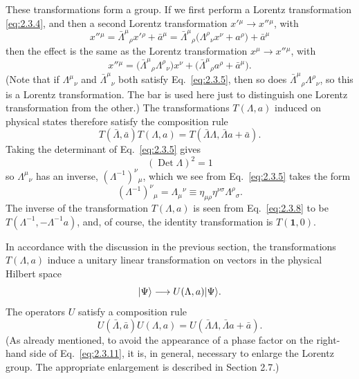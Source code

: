 These transformations form a group. If we first perform a Lorentz
transformation \eqref{eq:2.3.4}, and then a second Lorentz transformation
$x'{}^\mu\to x''{}^\mu$, with
\begin{equation*}
  x''{}^\mu=\bar\Lambda^\mu{}_{\rho}x'{}^\rho+\bar a^\mu
  =\bar\Lambda^\mu{}_{\rho}
    \bigl(\Lambda^\rho{}_{\nu}x^\nu+a^\rho\bigr)+\bar a^\mu
\end{equation*}
then the effect is the same as the Lorentz transformation
$x^\mu\to x''{}^\mu$, with
\begin{equation}
  x''{}^\mu
    =\bigl(\bar\Lambda^\mu{}_{\rho}\Lambda^\rho{}_{\nu}\bigr)x^\nu
      +\bigl(\bar\Lambda^\mu{}_{\rho}a^\rho+\bar a^\mu\bigr).
  \tag{2.3.7}\label{eq:2.3.7}
\end{equation}
(Note that if $\Lambda^\mu{}_{\nu}$ and $\bar\Lambda^\mu{}_{\nu}$ both
satisfy Eq.~\eqref{eq:2.3.5}, then so does
$\bar\Lambda^\mu{}_{\rho}\Lambda^\rho{}_{\nu}$, so this is a Lorentz
transformation. The bar is used here just to distinguish one Lorentz
transformation from the other.) The transformations $T(\Lambda,a)$
induced on physical states therefore satisfy the composition rule
\begin{equation}
  T(\bar\Lambda,\bar a)T(\Lambda,a)
    =T(\bar\Lambda\Lambda,\bar\Lambda a+\bar a).
  \tag{2.3.8}\label{eq:2.3.8}
\end{equation}
Taking the determinant of Eq.~\eqref{eq:2.3.5} gives
\begin{equation}
  (\operatorname{Det}\Lambda)^2=1
  \tag{2.3.9}\label{eq:2.3.9}
\end{equation}
so $\Lambda^\mu{}_{\nu}$ has an inverse,
$(\Lambda^{-1})^\nu{}_{\mu}$, which we see from Eq.~\eqref{eq:2.3.5} takes the form
\begin{equation}
  (\Lambda^{-1})^\nu{}_{\mu}
    =\Lambda_{\mu}{}^\nu
    \equiv\eta_{\mu\rho}\eta^{\nu\sigma}\Lambda^\rho{}_{\sigma}.
  \tag{2.3.10}\label{eq:2.3.10}
\end{equation}
The inverse of the transformation $T(\Lambda,a)$ is seen from Eq.~\eqref{eq:2.3.8}
to be $T(\Lambda^{-1},-\Lambda^{-1}a)$, and, of course, the identity
transformation is $T(\mathbf{1},0)$.

In accordance with the discussion in the previous section, the
transformations $T(\Lambda,a)$ induce a unitary linear transformation on
vectors in the physical Hilbert space
\begin{equation*}
  \lvert \Psi\rangle\longrightarrow U(\Lambda,a)\lvert \Psi\rangle.
\end{equation*}
The operators $U$ satisfy a composition rule
\begin{equation}
  U(\bar\Lambda,\bar a)U(\Lambda,a)
    =U(\bar\Lambda\Lambda,\bar\Lambda a+\bar a).
  \tag{2.3.11}\label{eq:2.3.11}
\end{equation}
(As already mentioned, to avoid the appearance of a phase factor on the
right-hand side of Eq.~\eqref{eq:2.3.11}, it is, in general, necessary to enlarge
the Lorentz group. The appropriate enlargement is described in
Section 2.7.)

